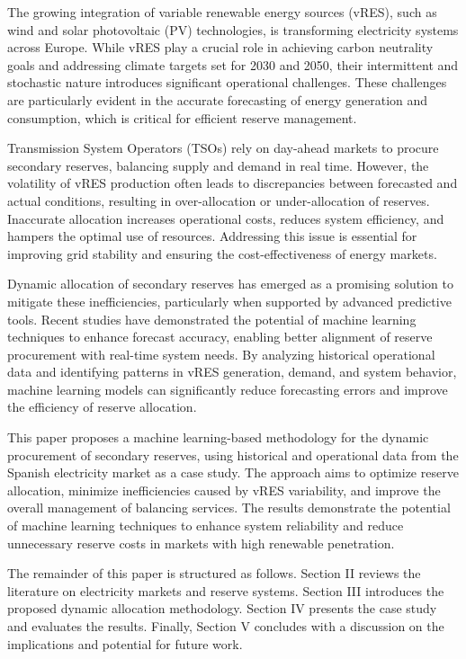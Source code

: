 \par
\par

The growing integration of variable renewable energy sources (vRES), such as wind and solar photovoltaic (PV) technologies, is transforming electricity systems across Europe. While vRES play a crucial role in achieving carbon neutrality goals and addressing climate targets set for 2030 and 2050, their intermittent and stochastic nature introduces significant operational challenges. These challenges are particularly evident in the accurate forecasting of energy generation and consumption, which is critical for efficient reserve management.\par
Transmission System Operators (TSOs) rely on day-ahead markets to procure secondary reserves, balancing supply and demand in real time. However, the volatility of vRES production often leads to discrepancies between forecasted and actual conditions, resulting in over-allocation or under-allocation of reserves. Inaccurate allocation increases operational costs, reduces system efficiency, and hampers the optimal use of resources. Addressing this issue is essential for improving grid stability and ensuring the cost-effectiveness of energy markets.\par
Dynamic allocation of secondary reserves has emerged as a promising solution to mitigate these inefficiencies, particularly when supported by advanced predictive tools. Recent studies have demonstrated the potential of machine learning techniques to enhance forecast accuracy, enabling better alignment of reserve procurement with real-time system needs. By analyzing historical operational data and identifying patterns in vRES generation, demand, and system behavior, machine learning models can significantly reduce forecasting errors and improve the efficiency of reserve allocation.\par
This paper proposes a machine learning-based methodology for the dynamic procurement of secondary reserves, using historical and operational data from the Spanish electricity market as a case study. The approach aims to optimize reserve allocation, minimize inefficiencies caused by vRES variability, and improve the overall management of balancing services. The results demonstrate the potential of machine learning techniques to enhance system reliability and reduce unnecessary reserve costs in markets with high renewable penetration.\par
The remainder of this paper is structured as follows. Section II reviews the literature on electricity markets and reserve systems. Section III introduces the proposed dynamic allocation methodology. Section IV presents the case study and evaluates the results. Finally, Section V concludes with a discussion on the implications and potential for future work.\par